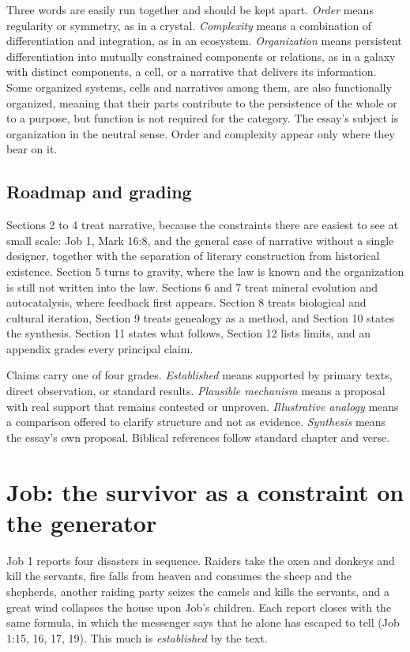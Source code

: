\documentclass[11pt]{article}
\begin{document}
Three words are easily run together and should be kept apart. \emph{Order} means regularity or symmetry, as in a crystal. \emph{Complexity} means a combination of differentiation and integration, as in an ecosystem. \emph{Organization} means persistent differentiation into mutually constrained components or relations, as in a galaxy with distinct components, a cell, or a narrative that delivers its information. Some organized systems, cells and narratives among them, are also functionally organized, meaning that their parts contribute to the persistence of the whole or to a purpose, but function is not required for the category. The essay's subject is organization in the neutral sense. Order and complexity appear only where they bear on it.

\subsection{Roadmap and grading}

Sections 2 to 4 treat narrative, because the constraints there are easiest to see at small scale: Job 1, Mark 16:8, and the general case of narrative without a single designer, together with the separation of literary construction from historical existence. Section 5 turns to gravity, where the law is known and the organization is still not written into the law. Sections 6 and 7 treat mineral evolution and autocatalysis, where feedback first appears. Section 8 treats biological and cultural iteration, Section 9 treats genealogy as a method, and Section 10 states the synthesis. Section 11 states what follows, Section 12 lists limits, and an appendix grades every principal claim.

Claims carry one of four grades. \emph{Established} means supported by primary texts, direct observation, or standard results. \emph{Plausible mechanism} means a proposal with real support that remains contested or unproven. \emph{Illustrative analogy} means a comparison offered to clarify structure and not as evidence. \emph{Synthesis} means the essay's own proposal. Biblical references follow standard chapter and verse.

\section{Job: the survivor as a constraint on the generator}

Job 1 reports four disasters in sequence. Raiders take the oxen and donkeys and kill the servants, fire falls from heaven and consumes the sheep and the shepherds, another raiding party seizes the camels and kills the servants, and a great wind collapses the house upon Job's children. Each report closes with the same formula, in which the messenger says that he alone has escaped to tell (Job 1:15, 16, 17, 19). This much is \emph{established} by the text.
\end{document}
